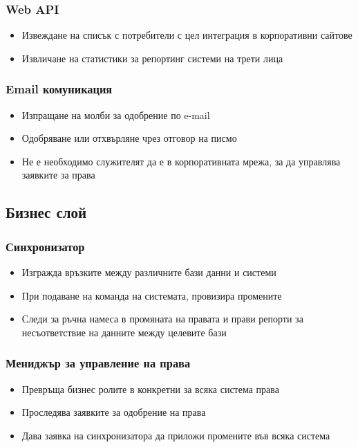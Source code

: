 \documentclass[bulgarian,a4paper,12pt,titlepage]{article}
\begin{document}
            \subsubsection{Web API}
                \begin{itemize}
                    \item Извеждане на списък с потребители с цел интеграция в корпоративни сайтове
                    \item Извличане на статистики за репортинг системи на трети лица
                \end{itemize}

            \subsubsection{Email комуникация}
                \begin{itemize}
                    \item Изпращане на молби за одобрение по e-mail
                    \item Одобряване или отхвърляне чрез отговор на писмо
                    \item Не е необходимо служителят да е в корпоративната мрежа, за да управлява заявките за права
                \end{itemize}

            
        \subsection{Бизнес слой}
            \subsubsection{Синхронизатор}
                \begin{itemize}
                    \item Изгражда връзките между различните бази данни и системи
                    \item При подаване на команда на системата, провизира промените
                    \item Следи за ръчна намеса в промяната на правата и прави репорти за несъответствие на данните между целевите бази
                \end{itemize}

            \subsubsection{Мениджър за управление на права}
                \begin{itemize}
                    \item Превръща бизнес ролите в конкретни за всяка система права
                    \item Проследява заявките за одобрение на права
                    \item Дава заявка на синхронизатора да приложи промените във всяка система
                \end{itemize}
\end{document}
